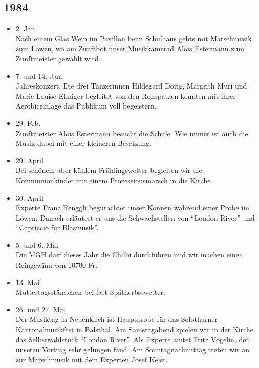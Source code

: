 \subsection{1984}

\begin{history}


    \begin{itemize}

        \item 2. Jan.\\
              Nach einem Glas Wein im Pavillon beim Schulhaus gehts mit Marschmusik
              zum Löwen, wo am Zunftbot unser Musikkamerad Alois Estermann zum
              Zunftmeister gewählt wird.

        \item 7. und 14. Jan.\\
              Jahreskonzert. Die drei Tänzerinnen Hildegard Dörig, Margrith Muri und
              Marie-Louise Elmiger begleitet von den Ronspatzen konnten mit ihrer
              Aerobiceinlage das Publikum voll begeistern.

        \item 29. Feb.\\
              Zunftmeister Alois Estermann besucht die Schule. Wie immer ist auch die
              Musik dabei mit einer kleineren Besetzung.

        \item 29. April\\
              Bei schönem aber kühlem Frühlingswetter begleiten wir die
              Kommunionkinder mit einem Prozessionsmarsch in die Kirche.

        \item 30. April\\
              Experte Franz Renggli begutachtet unser Können während einer Probe im
              Löwen. Danach erläutert er uns die Schwachstellen von \enquote{London
                  River} und \enquote{Capriccio für Blasmusik}.

        \item 5. und 6. Mai\\
              Die MGH darf dieses Jahr die Chilbi durchführen und wir machen einen
              Reingewinn von 10700 Fr.

        \item 13. Mai\\
              Muttertagsständchen bei fast Spätherbstwetter.

        \item 26. und 27. Mai\\
              Der Musiktag in Neuenkirch ist Hauptprobe für das Solothurner
              Kantonalmusikfest in Balsthal. Am Samstagabend spielen wir in der Kirche
              das Selbstwahlstück \enquote{London River}. Als Experte amtet Fritz
              Vögelin, der unseren Vortrag sehr gelungen fand. Am Sonntagnachmittag
              treten wir an zur Marschmusik mit dem Experten Josef Keist.


\end{itemize}
\end{history}
